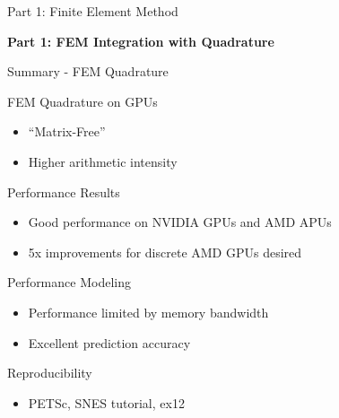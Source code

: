 




%
%

\begin{frame}{Part 1: Finite Element Method}
 \begin{center}
  {\Large \textbf{Part 1: FEM Integration with Quadrature}}
 \end{center}
\end{frame}










%
%
\begin{frame}{Summary - FEM Quadrature}

 \begin{block}{FEM Quadrature on GPUs}
  \begin{itemize}
   \item ``Matrix-Free''
   \item Higher arithmetic intensity
  \end{itemize}
 \end{block}

 \begin{block}{Performance Results}
  \begin{itemize}
   \item Good performance on NVIDIA GPUs and AMD APUs
   \item 5x improvements for discrete AMD GPUs desired
  \end{itemize}
 \end{block}

 \begin{block}{Performance Modeling}
  \begin{itemize}
   \item Performance limited by memory bandwidth
   \item Excellent prediction accuracy
  \end{itemize}
 \end{block}

  \begin{block}{Reproducibility}
  \begin{itemize}
   \item PETSc, SNES tutorial, ex12
  \end{itemize}
 \end{block}


\end{frame}


